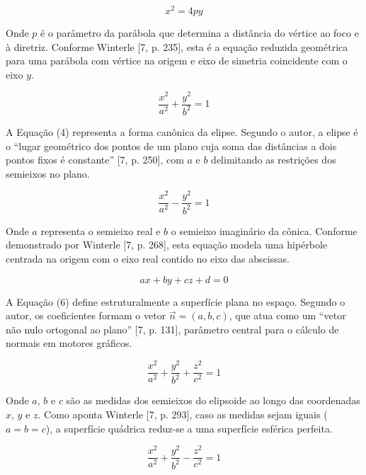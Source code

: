 \documentclass[conference,a4paper]{IEEEtran}
\begin{document}
\begin{equation}
x^2 = 4py \tag{3}
\end{equation}

Onde $p$ é o parâmetro da parábola que determina a distância do vértice ao foco e à diretriz. Conforme Winterle [7, p. 235], esta é a equação reduzida geométrica para uma parábola com vértice na origem e eixo de simetria coincidente com o eixo $y$.

\begin{equation}
\frac{x^2}{a^2}+\frac{y^2}{b^2} = 1 \tag{4}
\end{equation}

A Equação (4) representa a forma canônica da elipse. Segundo o autor, a elipse é o ``lugar geométrico dos pontos de um plano cuja soma das distâncias a dois pontos fixos é constante'' [7, p. 250], com $a$ e $b$ delimitando as restrições dos semieixos no plano.

\begin{equation}
\frac{x^2}{a^2}-\frac{y^2}{b^2} = 1 \tag{5}
\end{equation}

Onde $a$ representa o semieixo real e $b$ o semieixo imaginário da cônica. Conforme demonstrado por Winterle [7, p. 268], esta equação modela uma hipérbole centrada na origem com o eixo real contido no eixo das abscissas.

\begin{equation}
ax + by + cz + d = 0 \tag{6}
\end{equation}

A Equação (6) define estruturalmente a superfície plana no espaço. Segundo o autor, os coeficientes formam o vetor $\vec{n}=(a,b,c)$, que atua como um ``vetor não nulo ortogonal ao plano'' [7, p. 131], parâmetro central para o cálculo de normais em motores gráficos.

\begin{equation}
\frac{x^2}{a^2}+\frac{y^2}{b^2}+\frac{z^2}{c^2} = 1 \tag{7}
\end{equation}

Onde $a$, $b$ e $c$ são as medidas dos semieixos do elipsoide ao longo das coordenadas $x$, $y$ e $z$. Como aponta Winterle [7, p. 293], caso as medidas sejam iguais ($a = b = c$), a superfície quádrica reduz-se a uma superfície esférica perfeita.

\begin{equation}
\frac{x^2}{a^2}+\frac{y^2}{b^2}-\frac{z^2}{c^2} = 1 \tag{8}
\end{equation}
\end{document}
